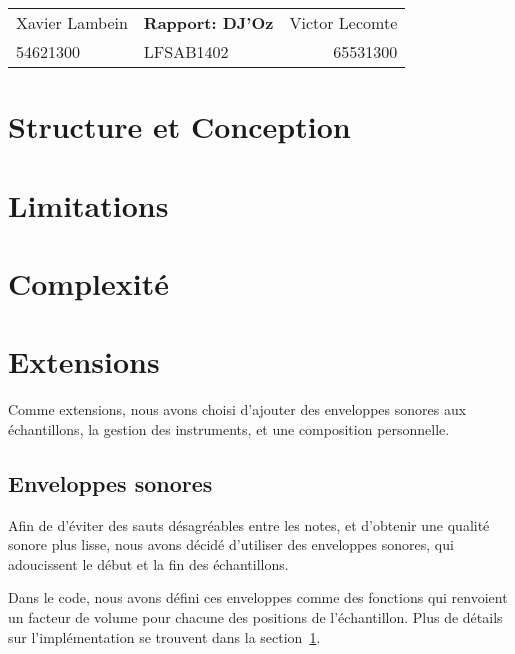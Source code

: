 \documentclass[a4paper,12pt]{article}
\begin{document}
\begin{center}
\begin{tabu} to \textwidth {lX[c]r}
    Xavier Lambein & \large{\textbf{Rapport: DJ'Oz}} & Victor Lecomte \\
    54621300 & LFSAB1402 & 65531300 \\
    \hline
\end{tabu}
\end{center}

\section{Structure et Conception}
\label{sec:struct}

\section{Limitations}

\section{Complexité}

\section{Extensions}

Comme extensions, nous avons choisi d'ajouter des enveloppes sonores
aux échantillons, la gestion des instruments, et une composition personnelle.

\subsection{Enveloppes sonores}
Afin de d'éviter des sauts désagréables entre les notes,
et d'obtenir une qualité sonore plus lisse,
nous avons décidé d'utiliser des enveloppes sonores,
qui adoucissent le début et la fin des échantillons.

Dans le code, nous avons défini ces enveloppes comme des fonctions
qui renvoient un facteur de volume pour chacune des positions
de l'échantillon.
Plus de détails sur l'implémentation se trouvent
dans la section~\ref{sec:struct}.
\end{document}
